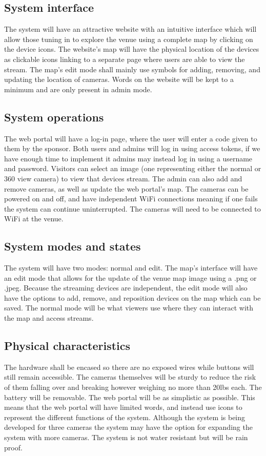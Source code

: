 \documentclass[onecolumn, draftclsnofoot,10pt, compsoc]{IEEEtran}
\begin{document}
    
    \subsection{System interface}
    The system will have an attractive website with an intuitive interface which will allow those tuning in to explore the venue using a complete map by clicking on the device icons. 
    The website's map will have the physical location of the devices as clickable icons linking to a separate page where users are able to view the stream.
    The map's edit mode shall mainly use symbols for adding, removing, and updating the location of cameras. Words on the website will be kept to a minimum and are only present in admin mode.

    \subsection{System operations}
    The web portal will have a log-in page, where the user will enter a code given to them by the sponsor.
    Both users and admins will log in using access tokens, if we have enough time to implement it admins may instead log in using a username and password.
    Visitors can select an image (one representing either the normal or 360 view camera) to view that devices stream. 
    The admin can also add and remove cameras, as well as update the web portal's map.
    The cameras can be powered on and off, and have independent WiFi connections meaning if one fails the system can continue uninterrupted. The cameras will need to be connected to WiFi at the venue.
    
    \subsection{System modes and states}
    The system will have two modes: normal and edit. The map’s interface will have an edit mode that allows for the update of the venue map image using a .png or .jpeg. 
    Because the streaming devices are independent, the edit mode will also have the options to add, remove, and reposition devices on the map which can be saved. The normal mode will be what viewers use where they can interact with the map and access streams.
    
    \subsection{Physical characteristics}
    The hardware shall be encased so there are no exposed wires while buttons will still remain accessible.
    The cameras themselves will be sturdy to reduce the risk of them falling over and breaking however weighing no more than 20lbs each. 
    The battery will be removable.
    The web portal will be as simplistic as possible.
    This means that the web portal will have limited words, and instead use icons to represent the different functions of the system. Although the system is being developed for three cameras the system may have the option for expanding the system with more cameras.
    The system is not water resistant but will be rain proof.
    
\end{document}
